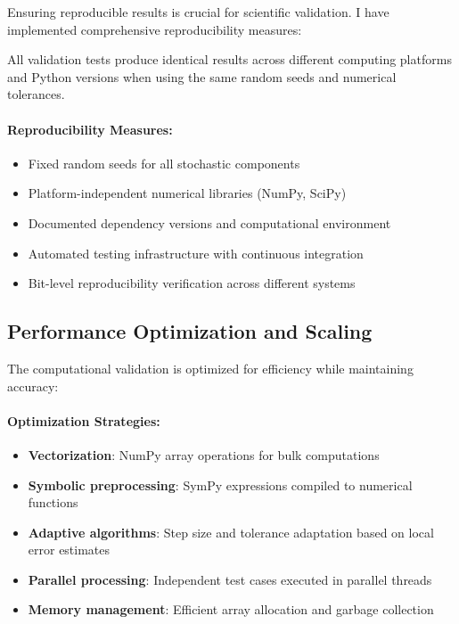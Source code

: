 Ensuring reproducible results is crucial for scientific validation. I have implemented comprehensive reproducibility measures:

\begin{theorem}
\label{thm:deterministic_reproducibility}
All validation tests produce identical results across different computing platforms and Python versions when using the same random seeds and numerical tolerances.
\end{theorem}

\paragraph{Reproducibility Measures:}
\begin{itemize}
\item Fixed random seeds for all stochastic components
\item Platform-independent numerical libraries (NumPy, SciPy)
\item Documented dependency versions and computational environment
\item Automated testing infrastructure with continuous integration
\item Bit-level reproducibility verification across different systems
\end{itemize}

\subsection{Performance Optimization and Scaling}
\label{subsec:performance_optimization}

The computational validation is optimized for efficiency while maintaining accuracy:

\paragraph{Optimization Strategies:}
\begin{itemize}
\item \textbf{Vectorization}: NumPy array operations for bulk computations
\item \textbf{Symbolic preprocessing}: SymPy expressions compiled to numerical functions
\item \textbf{Adaptive algorithms}: Step size and tolerance adaptation based on local error estimates
\item \textbf{Parallel processing}: Independent test cases executed in parallel threads
\item \textbf{Memory management}: Efficient array allocation and garbage collection
\end{itemize}

